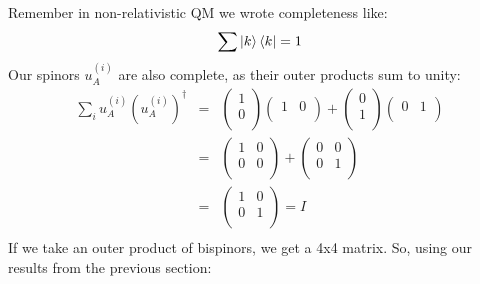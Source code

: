 \documentclass[12pt]{article}
\begin{document}
Remember in non-relativistic QM we wrote completeness like:
$$\sum \ket{k} \bra{k} = 1$$
Our spinors $u_A^{(i)}$ are also complete, as their outer products sum to unity:
\begin{eqnarray*}
\sum_i u_A^{(i)} (u_A^{(i)})^\dagger &=&
\begin{pmatrix} 1 \\ 0 \\ \end{pmatrix}
\begin{pmatrix} 1 & 0 \\\end{pmatrix}
+
\begin{pmatrix} 0 \\ 1 \\ \end{pmatrix}
\begin{pmatrix} 0 & 1 \\\end{pmatrix}\\
&=& \begin{pmatrix} 1 & 0 \\ 0 & 0 \\ \end{pmatrix}
+ \begin{pmatrix} 0 & 0 \\ 0 & 1 \\ \end{pmatrix}\\
&=& \begin{pmatrix} 1 & 0 \\ 0 & 1 \\ \end{pmatrix} = I\\
\end{eqnarray*}
If we take an outer product of bispinors, we get a 4x4 matrix.  So, using our results from the previous section:
\end{document}
